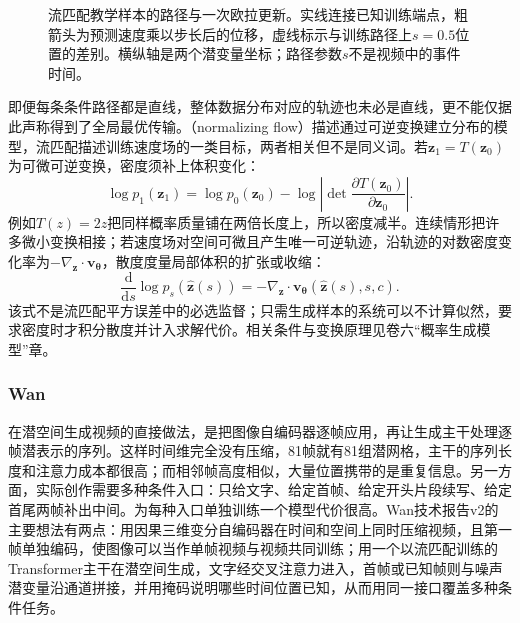 \begin{figure}[htbp]
  \centering
  
  \caption{流匹配教学样本的路径与一次欧拉更新。实线连接已知训练端点，粗箭头为预测速度乘以步长后的位移，虚线标示与训练路径上$s=0.5$位置的差别。横纵轴是两个潜变量坐标；路径参数$s$不是视频中的事件时间。}
  \label{fig:vision-flow-step}
\end{figure}

即便每条条件路径都是直线，整体数据分布对应的轨迹也未必是直线，更不能仅据此声称得到了全局最优传输。（normalizing flow）描述通过可逆变换建立分布的模型，流匹配描述训练速度场的一类目标，两者相关但不是同义词。若$\bm z_1=T(\bm z_0)$为可微可逆变换，密度须补上体积变化：
\begin{equation}
  \log p_1(\bm z_1)
    =\log p_0(\bm z_0)
       -\log\left|\det
          \frac{\partial T(\bm z_0)}{\partial\bm z_0}\right|.
  \label{eq:vision-flow-density-transform}
\end{equation}
例如$T(z)=2z$把同样概率质量铺在两倍长度上，所以密度减半。连续情形把许多微小变换相接；若速度场对空间可微且产生唯一可逆轨迹，沿轨迹的对数密度变化率为$-\nabla_{\bm z}\cdot\bm v_{\bm\theta}$，散度度量局部体积的扩张或收缩：
\begin{equation}
  \frac{\mathrm d}{\mathrm ds}
        \log p_s(\widehat{\bm z}(s))
    =-\nabla_{\bm z}\cdot
          \bm v_{\bm\theta}(\widehat{\bm z}(s),s,c).
  \label{eq:vision-flow-density-divergence}
\end{equation}
该式不是流匹配平方误差中的必选监督；只需生成样本的系统可以不计算似然，要求密度时才积分散度并计入求解代价。相关条件与变换原理见卷六“概率生成模型”章。

\subsubsection{Wan}
\label{sec:vision-models-wan}

在潜空间生成视频的直接做法，是把图像自编码器逐帧应用，再让生成主干处理逐帧潜表示的序列。这样时间维完全没有压缩，81帧就有81组潜网格，主干的序列长度和注意力成本都很高；而相邻帧高度相似，大量位置携带的是重复信息。另一方面，实际创作需要多种条件入口：只给文字、给定首帧、给定开头片段续写、给定首尾两帧补出中间。为每种入口单独训练一个模型代价很高。Wan技术报告v2的主要想法有两点：用因果三维变分自编码器在时间和空间上同时压缩视频，且第一帧单独编码，使图像可以当作单帧视频与视频共同训练；用一个以流匹配训练的Transformer主干在潜空间生成，文字经交叉注意力进入，首帧或已知帧则与噪声潜变量沿通道拼接，并用掩码说明哪些时间位置已知，从而用同一接口覆盖多种条件任务。

